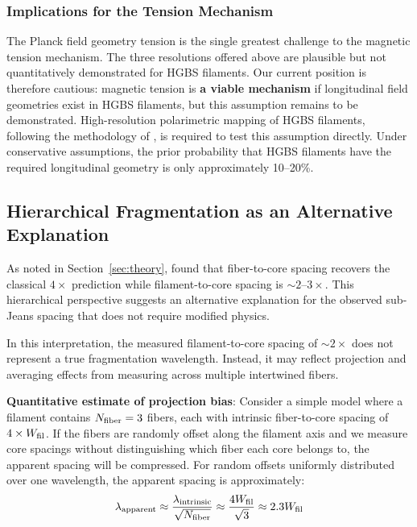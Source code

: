 \documentclass[11pt,a4paper]{article}
\begin{document}
\subsubsection{Implications for the Tension Mechanism}

The Planck field geometry tension is the single greatest challenge to the magnetic tension mechanism. The three resolutions offered above are plausible but not quantitatively demonstrated for HGBS filaments. Our current position is therefore cautious: magnetic tension is \textbf{a viable mechanism} if longitudinal field geometries exist in HGBS filaments, but this assumption remains to be demonstrated. High-resolution polarimetric mapping of HGBS filaments, following the methodology of \citet{Jadhav2026}, is required to test this assumption directly. Under conservative assumptions, the prior probability that HGBS filaments have the required longitudinal geometry is only approximately 10--20\%.

\subsection{Hierarchical Fragmentation as an Alternative Explanation}
\label{sec:hierarchical}

As noted in Section~\ref{sec:theory}, \citet{Yang2024} found that fiber-to-core spacing recovers the classical $4\times$ prediction while filament-to-core spacing is $\sim2$--$3\times$. This hierarchical perspective suggests an alternative explanation for the observed sub-Jeans spacing that does not require modified physics.

In this interpretation, the measured filament-to-core spacing of $\sim2\times$ does not represent a true fragmentation wavelength. Instead, it may reflect projection and averaging effects from measuring across multiple intertwined fibers.

\textbf{Quantitative estimate of projection bias}: Consider a simple model where a filament contains $N_{\rm fiber} = 3$ fibers, each with intrinsic fiber-to-core spacing of $4\times W_{\rm fil}$. If the fibers are randomly offset along the filament axis and we measure core spacings without distinguishing which fiber each core belongs to, the apparent spacing will be compressed. For random offsets uniformly distributed over one wavelength, the apparent spacing is approximately:
\begin{equation}
\lambda_{\rm apparent} \approx \frac{\lambda_{\rm intrinsic}}{\sqrt{N_{\rm fiber}}} \approx \frac{4 W_{\rm fil}}{\sqrt{3}} \approx 2.3 W_{\rm fil}
\end{equation}
\end{document}
